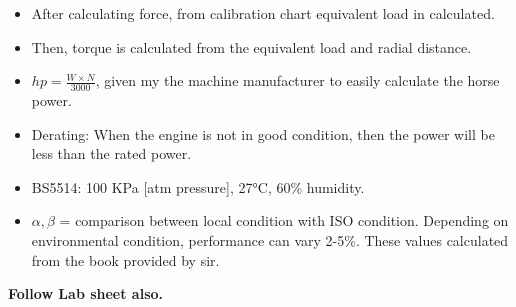 \documentclass{article}
\begin{document}
\begin{multicols}{2}
\begin{itemize}
    \item After calculating force, from calibration chart equivalent load in calculated. 
    \item Then, torque is calculated from the equivalent load and radial distance.
    \item $hp = \frac{W\times N}{3000}$, given my the machine manufacturer to easily calculate the horse power.
    \item Derating: When the engine is not in good condition, then the power will be less than the rated power.
    \item BS5514: 100 KPa [atm pressure], 27°C, 60\% humidity.
    \item $\alpha, \beta$ = comparison between local condition with ISO condition. Depending on environmental condition, performance can vary 2-5\%. These values calculated from the book provided by sir. 
  \end{itemize}
\end{multicols}

\hrulefill \textbf{Follow Lab sheet also.}\\
\hrulefill
\end{document}
